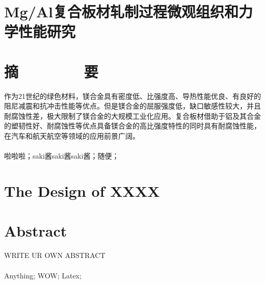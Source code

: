 \section*{\heiti Mg/Al复合板材轧制过程微观组织和力学性能研究}
\section*{\heiti 摘\ \ \ \ \ \ \ \ 要}

作为21世纪的绿色材料，镁合金具有密度低、比强度高、导热性能优良、有良好的阻尼减震和抗冲击性能等优点。但是镁合金的屈服强度低，缺口敏感性较大，并且耐腐蚀性差，极大限制了镁合金的大规模工业化应用。复合板材借助于铝及其合金的塑韧性好、耐腐蚀性等优点具备镁合金的高比强度特性的同时具有耐腐蚀性能，在汽车和航天航空等领域的应用前景广阔。
\\
\\
啦啦啦；saki酱saki酱saki酱；随便；

\clearpage


\section*{\bfseries The Design of XXXX}



\section*{\bfseries Abstract}

WRITE UR OWN ABSTRACT
	\\
	\\
	Anything; WOW; Latex;

\clearpage




